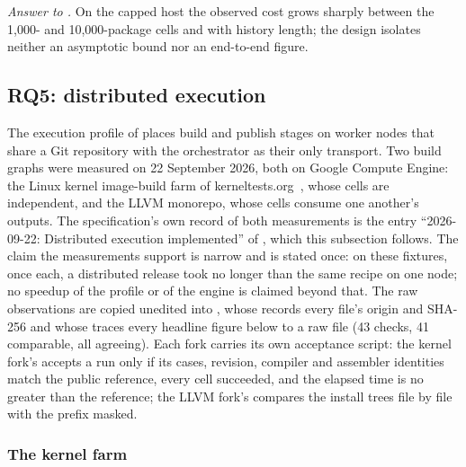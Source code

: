\emph{Answer to .} On the capped host the observed cost grows sharply
between the 1,000- and 10,000-package cells and with history length; the
design isolates neither an asymptotic bound nor an end-to-end figure.

\subsection{RQ5: distributed execution}
\label{sec:eval:rq5}

The execution profile of  places build and publish stages on worker
nodes that share a Git repository with the orchestrator as their only
transport. Two build graphs were measured on 22 September 2026, both on
Google Compute Engine: the Linux kernel image-build farm of
kerneltests.org~\cite{kerneltests}, whose cells are independent, and the LLVM
monorepo, whose cells consume one another's outputs. The specification's own
record of both measurements is the entry ``2026-09-22: Distributed execution
implemented'' of , which this subsection follows. The
claim the measurements support is narrow and is stated once: on these
fixtures, once each, a distributed release took no longer than the same
recipe on one node; no speedup of the profile or of the engine is claimed
beyond that. The raw observations are copied unedited into
, whose
 records every file's origin and SHA-256 and whose
 traces every headline figure below to a raw file
(43 checks, 41 comparable, all agreeing). Each fork carries its own acceptance
script: the kernel fork's  accepts a run only if its
cases, revision, compiler and assembler identities match the public
reference, every cell succeeded, and the elapsed time is no greater than the
reference; the LLVM fork's  compares the
install trees file by file with the prefix masked.

\subsubsection{The kernel farm}
\label{sec:eval:rq5:kernel}

